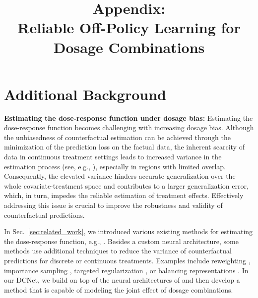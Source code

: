 \title{Appendix: \\Reliable Off-Policy Learning for Dosage Combinations}

\maketitle

\appendix

\section{Additional Background} \label{sec:appendix_background}

\textbf{Estimating the dose-response function under dosage bias:}
Estimating the dose-response function becomes challenging with increasing dosage bias. Although the unbiasedness of counterfactual estimation can be achieved through the minimization of the prediction loss on the factual data, the inherent scarcity of data in continuous treatment settings leads to increased variance in the estimation process
(see, e.g., \cite{Bellot.2022}), especially in regions with limited overlap. Consequently, the elevated variance hinders accurate generalization over the whole covariate-treatment space and contributes to a larger generalization error, which, in turn, impedes the reliable estimation of treatment effects. Effectively addressing this issue is crucial to improve the robustness and validity of counterfactual predictions.

In Sec.~\ref{sec:related_work}, we introduced various existing methods for estimating the dose-response function, e.g.,  \cite{Bica.2020c, Hirano.2004, Imai.2004, Imbens.2000, Nie.2021b, Schwab.2020}. Besides a custom neural architecture, some methods use additional techniques to reduce the variance of counterfactual predictions for discrete or continuous treatments. Examples include reweighting \cite{rosenbaum1987model, wang2022generalization}, importance sampling \cite{hassanpour2019counterfactual}, targeted regularization \cite{Nie.2021}, or balancing representations \cite{ Bellot.2022, Johansson.2016, Schwab.2020}.  In our DCNet, we build on top of the neural architectures of \cite{Nie.2021b, Schwab.2020} and then develop a method that is capable of modeling the joint effect of dosage combinations. 

